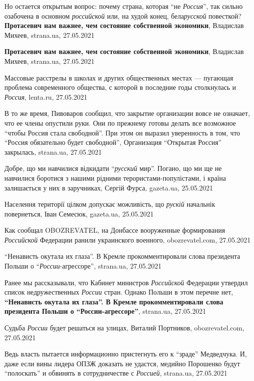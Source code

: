 Но остается открытым вопрос: почему страна, которая \enquote{не \emph{Россия}},
так сильно озабочена в основном \emph{российской} или, на худой конец,
бела\emph{русской} повесткой?
\textbf{Протасевич нам важнее, чем состояние собственной экономики}, Владислав Михеев, 
strana.ua, 27.05.2021

\textbf{Протасевич нам важнее, чем состояние собственной экономики}, Владислав Михеев, 
strana.ua, 27.05.2021

Массовые расстрелы в школах и других общественных местах — пугающая проблема
современного общества, с которой в последние годы столкнулась и \emph{Россия},
lenta.ru, 27.05.2021

В то же время, Пивоваров сообщил, что закрытие организации вовсе не означает,
что ее члены опустили руки. Они по прежнему готовы делать все возможное
\enquote{чтобы Россия стала свободной}. При этом он выразил уверенность в том,
что \enquote{Россия обязательно будет свободной}, Организация \enquote{Открытая
Россия} закрылась, strana.ua, 27.05.2021

Добре, що ми навчилися відкидати \enquote{\emph{русский} мир}. Погано, що ми ще
не навчилися боротися з нашими рідними терористами-популістами, і країна
залишається у них в заручниках, Сергій Фурса, gazeta.ua, 25.05.2021

Населення території цілком допускає можливість, що \emph{рускій} начальнік
повернеться, Іван Семесюк, gazeta.ua, 25.05.2021

Как сообщал OBOZREVATEL, на Донбассе вооруженные формирования \emph{Российской}
Федерации ранили украинского военного, obozrevatel.com, 27.05.2021

\enquote{Ненависть окутала их глаза}. В Кремле прокомментировали слова
президента Польши о \enquote{\emph{России}-агрессоре}, strana.ua, 27.05.2021

Ранее мы рассказывали, что Кабинет министров \emph{Российской} Федерации
утвердил список недружественных \emph{России} стран. Однако Польши в этом
перечне нет, \textbf{\enquote{Ненависть окутала их глаза}. В Кремле
прокомментировали слова президента Польши о \enquote{России-агрессоре}},
strana.ua, 27.05.2021

Судьба \emph{России} будет решаться на улицах, Виталий Портников,
obozrevatel.com, 27.05.2021

Ведь власть пытается информационно пристегнуть его к \enquote{зраде} Медведчука. И,
даже если вины лидера ОПЗЖ доказать не удастся, медийно Порошенко будут
\enquote{полоскать} и обвинять в сотрудничестве с \emph{Россией}, strana.ua, 27.05.2021


